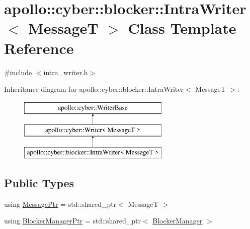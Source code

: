 \hypertarget{classapollo_1_1cyber_1_1blocker_1_1IntraWriter}{\section{apollo\-:\-:cyber\-:\-:blocker\-:\-:Intra\-Writer$<$ Message\-T $>$ Class Template Reference}
\label{classapollo_1_1cyber_1_1blocker_1_1IntraWriter}
}


{\ttfamily \#include $<$intra\-\_\-writer.\-h$>$}

Inheritance diagram for apollo\-:\-:cyber\-:\-:blocker\-:\-:Intra\-Writer$<$ Message\-T $>$\-:\begin{figure}[H]
\begin{center}
\leavevmode
\includegraphics[height=3.000000cm]{classapollo_1_1cyber_1_1blocker_1_1IntraWriter}
\end{center}
\end{figure}
\subsection*{Public Types}
\begin{DoxyCompactItemize}
\item 
using \hyperlink{classapollo_1_1cyber_1_1blocker_1_1IntraWriter_a34952ec52c4ab25fdbbbbc5cb17868f4}{Message\-Ptr} = std\-::shared\-\_\-ptr$<$ Message\-T $>$
\item 
using \hyperlink{classapollo_1_1cyber_1_1blocker_1_1IntraWriter_a92d37eb69d0c02aa8eef3824e24b2f64}{Blocker\-Manager\-Ptr} = std\-::shared\-\_\-ptr$<$ \hyperlink{classapollo_1_1cyber_1_1blocker_1_1BlockerManager}{Blocker\-Manager} $>$
\end{DoxyCompactItemize}
